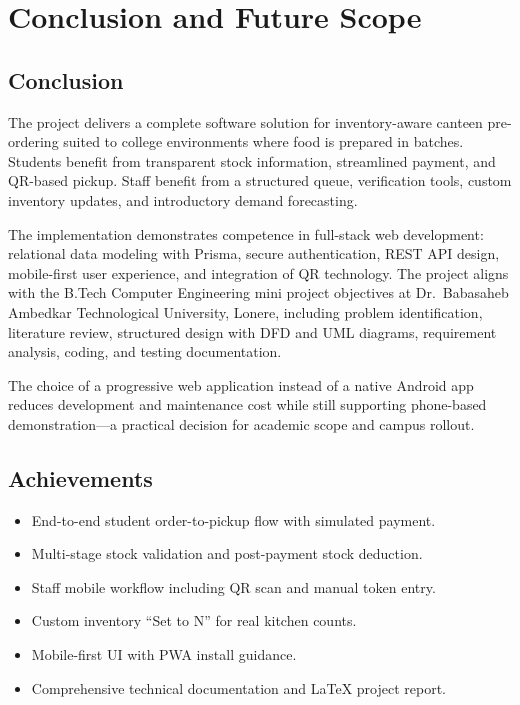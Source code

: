 \chapter{Conclusion and Future Scope}

\section{Conclusion}
The \ShortTitle{} project delivers a complete software solution for inventory-aware canteen pre-ordering suited to college environments where food is prepared in batches. Students benefit from transparent stock information, streamlined payment, and QR-based pickup. Staff benefit from a structured queue, verification tools, custom inventory updates, and introductory demand forecasting.

The implementation demonstrates competence in full-stack web development: relational data modeling with Prisma, secure authentication, REST API design, mobile-first user experience, and integration of QR technology. The project aligns with the B.Tech Computer Engineering mini project objectives at Dr.\ Babasaheb Ambedkar Technological University, Lonere, including problem identification, literature review, structured design with DFD and UML diagrams, requirement analysis, coding, and testing documentation.

The choice of a progressive web application instead of a native Android app reduces development and maintenance cost while still supporting phone-based demonstration---a practical decision for academic scope and campus rollout.

\section{Achievements}
\begin{itemize}
  \item End-to-end student order-to-pickup flow with simulated payment.
  \item Multi-stage stock validation and post-payment stock deduction.
  \item Staff mobile workflow including QR scan and manual token entry.
  \item Custom inventory ``Set to N'' for real kitchen counts.
  \item Mobile-first UI with PWA install guidance.
  \item Comprehensive technical documentation and LaTeX project report.
\end{itemize}


